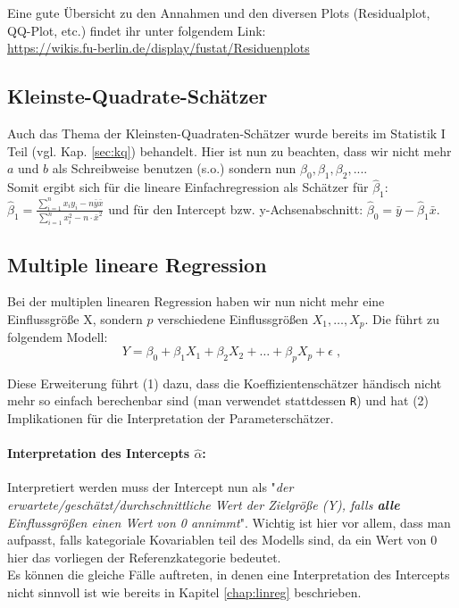 \documentclass[a4paper]{article}
\newcommand\dangersign{%
 \makebox[1.8em][c]{%
 \makebox[0pt][c]{\raisebox{.15em}{\small!}}%
 \makebox[0pt][c]{\color{red}\Large$\triangle$}}}%
\begin{document}
Eine gute Übersicht zu den Annahmen und den diversen Plots (Residualplot, QQ-Plot, etc.) findet ihr unter folgendem Link:\\
\url{https://wikis.fu-berlin.de/display/fustat/Residuenplots}

\subsection{Kleinste-Quadrate-Schätzer}
Auch das Thema der Kleinsten-Quadraten-Schätzer wurde bereits im Statistik I Teil (vgl. Kap. \ref{sec:kq}) behandelt. Hier ist nun zu beachten, dass wir nicht mehr $a$ und $b$ als Schreibweise benutzen (s.o.) sondern nun $\beta_0, \beta_1, \beta_2,....$\\
Somit ergibt sich für die lineare Einfachregression als Schätzer für $\hat{\beta}_1$: $\hat{\beta}_1=\frac{\sum_{i=1}^n x_iy_i-n\bar y\bar x}{\sum_{i=1}^n x^2_i-n\cdot \bar x^2}$ und für den Intercept bzw. y-Achsenabschnitt: $\hat\beta_0=\bar y-\hat\beta_1\bar x$.

\subsection{Multiple lineare Regression}\label{sec:mult-reg}
Bei der multiplen linearen Regression haben wir nun nicht mehr eine Einflussgröße X, sondern $p$ verschiedene Einflussgrößen $X_1, \hdots, X_p$. Die führt zu folgendem Modell:
$$Y = \beta_0 + \beta_1 X_1 + \beta_2 X_2 + \hdots + \beta_p X_p + \epsilon\;,$$ 

\noindent Diese Erweiterung führt (1) dazu, dass die Koeffizientenschätzer händisch nicht mehr so einfach berechenbar sind (man verwendet stattdessen \texttt{R}) und hat (2) Implikationen für die Interpretation der Parameterschätzer.

\paragraph{Interpretation des Intercepts $\hat \alpha$:} Interpretiert werden muss der Intercept nun als "\textit{der erwartete/geschätzt/durchschnittliche Wert der Zielgröße (Y), falls \textbf{alle} Einflussgrößen einen Wert von 0 annimmt}". Wichtig ist hier vor allem, dass man aufpasst, falls kategoriale Kovariablen teil des Modells sind, da ein Wert von 0 hier das vorliegen der Referenzkategorie bedeutet.\\

\noindent \dangersign Es können die gleiche Fälle auftreten, in denen eine Interpretation des Intercepts nicht sinnvoll ist wie bereits in Kapitel \ref{chap:linreg} beschrieben.
\end{document}
